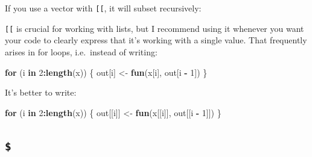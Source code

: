\documentclass[]{book}
\newenvironment{Shaded}{\begin{snugshade}}{\end{snugshade}}
\newcommand{\KeywordTok}[1]{\textcolor[rgb]{0.13,0.29,0.53}{\textbf{#1}}}
\newcommand{\DataTypeTok}[1]{\textcolor[rgb]{0.13,0.29,0.53}{#1}}
\newcommand{\DecValTok}[1]{\textcolor[rgb]{0.00,0.00,0.81}{#1}}
\newcommand{\StringTok}[1]{\textcolor[rgb]{0.31,0.60,0.02}{#1}}
\newcommand{\CommentTok}[1]{\textcolor[rgb]{0.56,0.35,0.01}{\textit{#1}}}
\newcommand{\ControlFlowTok}[1]{\textcolor[rgb]{0.13,0.29,0.53}{\textbf{#1}}}
\newcommand{\OperatorTok}[1]{\textcolor[rgb]{0.81,0.36,0.00}{\textbf{#1}}}
\newcommand{\NormalTok}[1]{#1}
\theoremstyle{definition}
\theoremstyle{definition}
\theoremstyle{definition}
\theoremstyle{remark}
\begin{document}
If you use a vector with \texttt{{[}{[}}, it will subset recursively:

\begin{Shaded}
\end{Shaded}

\texttt{{[}{[}} is crucial for working with lists, but I recommend using
it whenever you want your code to clearly express that it's working with
a single value. That frequently arises in for loops, i.e.~instead of
writing:

\begin{Shaded}
\begin{Highlighting}[]
\ControlFlowTok{for}\NormalTok{ (i }\ControlFlowTok{in} \DecValTok{2}\OperatorTok{:}\KeywordTok{length}\NormalTok{(x)) \{}
\NormalTok{  out[i] <-}\StringTok{ }\KeywordTok{fun}\NormalTok{(x[i], out[i }\OperatorTok{-}\StringTok{ }\DecValTok{1}\NormalTok{])}
\NormalTok{\}}
\end{Highlighting}
\end{Shaded}

It's better to write:

\begin{Shaded}
\begin{Highlighting}[]
\ControlFlowTok{for}\NormalTok{ (i }\ControlFlowTok{in} \DecValTok{2}\OperatorTok{:}\KeywordTok{length}\NormalTok{(x)) \{}
\NormalTok{  out[[i]] <-}\StringTok{ }\KeywordTok{fun}\NormalTok{(x[[i]], out[[i }\OperatorTok{-}\StringTok{ }\DecValTok{1}\NormalTok{]])}
\NormalTok{\}}
\end{Highlighting}
\end{Shaded}

\subsection{\texorpdfstring{\texttt{\$}}{\$}}\label{section}
\end{document}
